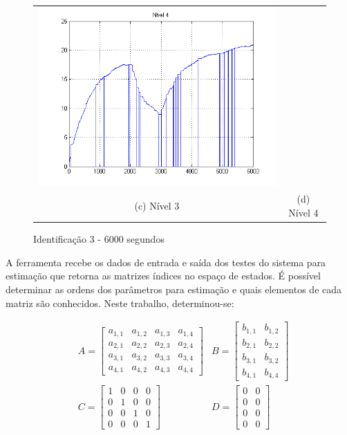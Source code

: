 \begin{figure}[H]
\begin{tabular}{cc}
		\includegraphics[height=0.15\paperheight,keepaspectratio]{img/sim3_h4.png} \\
		(c) Nível 3 &
		(d) Nível 4
	\end{tabular}
	\caption{\label{imgID_6000} Identificação 3 - 6000 segundos}
\end{figure}

A ferramenta recebe os dados de entrada e saída dos testes do sistema para estimação que retorna as matrizes índices no espaço de estados. É possível determinar as ordens dos parâmetros para estimação e quais elementos de cada matriz são conhecidos. Neste trabalho, determinou-se:

\begin{align}
	& A =
	\begin{bmatrix}
		a_{1,1} & a_{1,2} & a_{1,3} & a_{1,4} \\
		a_{2,1} & a_{2,2} & a_{2,3} & a_{2,4} \\
		a_{3,1} & a_{3,2} & a_{3,3} & a_{3,4} \\
		a_{4,1} & a_{4,2} & a_{4,3} & a_{4,4}
	\end{bmatrix}
	& B =
	\begin{bmatrix}
		b_{1,1} & b_{1,2} \\
		b_{2,1} & b_{2,2} \\
		b_{3,1} & b_{3,2} \\
		b_{4,1} & b_{4,4}
	\end{bmatrix} \\
	& C  = 
	\begin{bmatrix}
		1 & 0 & 0 & 0 \\
		0 & 1 & 0 & 0 \\
		0 & 0 & 1 & 0 \\
		0 & 0 & 0 & 1
	\end{bmatrix} 
	& D  = 
	\begin{bmatrix}
		0 & 0 \\
		0 & 0 \\
		0 & 0 \\
		0 & 0
	\end{bmatrix}
\end{align}

